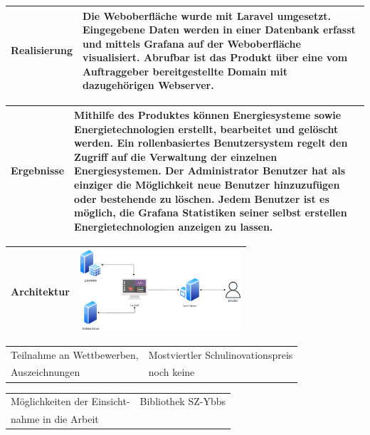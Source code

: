 \begin{tabular}{|p{\feldC}|p{\feldD}|}
 \hline
 Realisierung & Die Weboberfläche wurde mit Laravel umgesetzt. Eingegebene Daten werden in einer Datenbank erfasst und mittels Grafana auf der Weboberfläche visualisiert. Abrufbar ist das Produkt über eine vom Auftraggeber bereitgestellte Domain mit dazugehörigen Webserver.  \\
 \hline
\end{tabular}

\begin{tabular}{|p{\feldC}|p{\feldD}|}
 \hline
 Ergebnisse &  Mithilfe des Produktes können Energiesysteme sowie Energietechnologien erstellt, bearbeitet und gelöscht werden. Ein rollenbasiertes Benutzersystem regelt den Zugriff auf die Verwaltung der einzelnen Energiesystemen. Der Administrator Benutzer hat als einziger die Möglichkeit neue Benutzer hinzuzufügen oder bestehende zu löschen. Jedem Benutzer ist es möglich, die Grafana Statistiken seiner selbst erstellen Energietechnologien anzeigen zu lassen.\\
 \hline
\end{tabular}

\begin{tabular}{|p{\feldC}|p{\feldD}|}
 \hline
 Architektur &  
 \rule{0pt}{3cm+1ex} 
 \includegraphics[height=3cm]{images/Architektur} \\
 
 \hline
\end{tabular}


\begin{tabular}{|p{\feldC}|p{\feldD}|}
 \hline
 Teilnahme an Wettbewerben, & Mostviertler Schulinovationspreis \\
 Auszeichnungen & noch keine\\
 \hline
\end{tabular}

\begin{tabular}{|p{\feldC}|p{\feldD}|}
 \hline
 Möglichkeiten der Einsicht- & Bibliothek SZ-Ybbs \\
 nahme in die Arbeit & \\
 \hline
\end{tabular}

